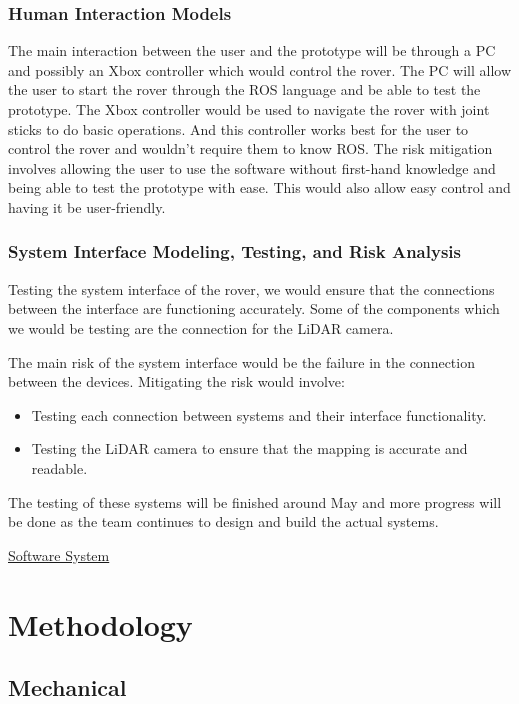 \documentclass[a4paper, 10pt]{article}
\begin{document}
 		\subsubsection{Human Interaction Models}
		The main interaction between the user and the prototype will be through a PC and possibly an Xbox controller which would control the rover. The PC will allow the user to start the rover through the ROS language and be able to test the prototype. The Xbox controller would be used to navigate the rover with joint sticks to do basic operations. And this controller works best for the user to control the rover and wouldn't require them to know ROS. The risk mitigation involves allowing the user to use the software without first-hand knowledge and being able to test the prototype with ease. This would also allow easy control and having it be user-friendly.

		\subsubsection{System Interface Modeling, Testing, and Risk Analysis}
		Testing the system interface of the rover, we would ensure that the connections between the interface are functioning accurately. Some of the components which we would be testing are the connection for the LiDAR camera. 

		The main risk of the system interface would be the failure in the connection between the devices. Mitigating the risk would involve:

		\begin{itemize}
			\item
			Testing each connection between systems and their interface functionality.

			\item
			Testing the LiDAR camera to ensure that the mapping is accurate and readable. 
		\end{itemize}

		The testing of these systems will be finished around May and more progress will be done as the team continues to design and build the actual systems.
 		
 		
\underline{Software System}

\section{Methodology}
	\subsection{Mechanical}
\end{document}
